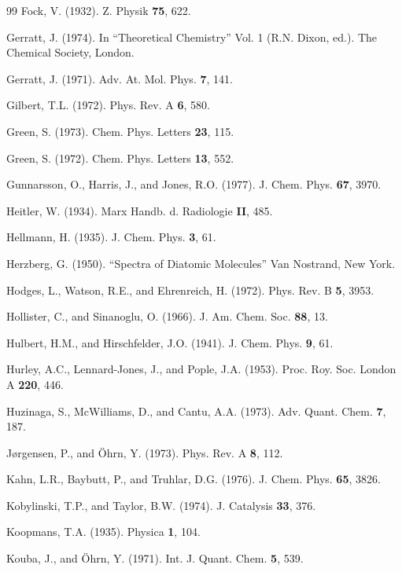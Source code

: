 \documentclass[12pt,letterpaper]{report}
\begin{document}
\begin{thebibliography}{99}
 Fock, V. (1932). Z. Physik \textbf{75}, 622.

 Gerratt, J. (1974). In ``Theoretical Chemistry'' Vol. 1 (R.N. Dixon, ed.). The Chemical Society, London.

 Gerratt, J. (1971). Adv. At. Mol. Phys. \textbf{7}, 141.

 Gilbert, T.L. (1972). Phys. Rev. A \textbf{6}, 580.

 Green, S. (1973). Chem. Phys. Letters \textbf{23}, 115.

 Green, S. (1972). Chem. Phys. Letters \textbf{13}, 552.

 Gunnarsson, O., Harris, J., and Jones, R.O. (1977). J. Chem. Phys. \textbf{67}, 3970.

 Heitler, W. (1934). Marx Handb. d. Radiologie \textbf{II}, 485.

 Hellmann, H. (1935). J. Chem. Phys. \textbf{3}, 61.

 Herzberg, G. (1950). ``Spectra of Diatomic Molecules'' Van Nostrand, New York.

 Hodges, L., Watson, R.E., and Ehrenreich, H. (1972). Phys. Rev. B \textbf{5}, 3953.

 Hollister, C., and Sinanoglu, O. (1966). J. Am. Chem. Soc. \textbf{88}, 13.

 Hulbert, H.M., and Hirschfelder, J.O. (1941). J. Chem. Phys. \textbf{9}, 61.

 Hurley, A.C., Lennard-Jones, J., and Pople, J.A. (1953). Proc. Roy. Soc. London A \textbf{220}, 446.

 Huzinaga, S., McWilliams, D., and Cantu, A.A. (1973). Adv. Quant. Chem. \textbf{7}, 187.

 Jørgensen, P., and Öhrn, Y. (1973). Phys. Rev. A \textbf{8}, 112.

 Kahn, L.R., Baybutt, P., and Truhlar, D.G. (1976). J. Chem. Phys. \textbf{65}, 3826.

 Kobylinski, T.P., and Taylor, B.W. (1974). J. Catalysis \textbf{33}, 376.

 Koopmans, T.A. (1935). Physica \textbf{1}, 104.

 Kouba, J., and Öhrn, Y. (1971). Int. J. Quant. Chem. \textbf{5}, 539.


\end{thebibliography}
\end{document}
